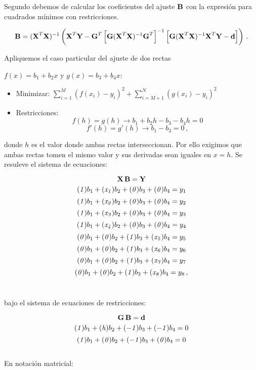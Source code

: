 \documentclass[
]{agujournal2019}
\begin{document}
Segundo debemos de calcular los coeficientes del ajuste \({\textbf B}\)
con la expresión para cuadrados mínimos con restricciones.

\[{\textbf B}=({\textbf X}^T {\textbf X})^{-1}\left( {\textbf X}^T {\textbf Y} - {\textbf G}^T\left[{\textbf G}({\textbf X}^T{\textbf X})^{-1}{\textbf G}^T \right]^{-1}
           \left[{\textbf G}({\textbf X}^T{\textbf X})^{-1}{\textbf X}^T {\textbf Y}-{\textbf d}\right] \right)\,.\]

Apliquemos el caso particular del ajuste de dos rectas

\(f(x)=b_1 + b_2 x\) y \(g(x)=b_3 + b_4 x\):\\

\begin{itemize}
\item Minimizar:  $\sum\limits^M_{i=1}(f(x_i)-y_i)^2 + \sum\limits^N_{i=M+1}(g(x_i)-y_i)^2$
\item Restricciones:
      $$f(h)=g(h)\rightarrow b_1+b_2 h - b_3 -b_4 h=0$$
      $$f'(h)=g'(h)\rightarrow b_1          - b_3           =0\,,$$
\end{itemize}

donde \(h\) es el valor donde ambas rectas interseccionan. Por ello
exigimos que ambas rectas tomen el mismo valor y sus derivadas sean
iguales en \(x=h\). Se resuleve el sistema de ecuaciones:

\[{\textbf X}\,{\textbf B}={\textbf Y}\]
\[({\it 1})b_1+({\it x_1})b_2 + ({\it 0})b_3 + ({\it 0})b_4=y_1\]
\[({\it 1})b_1+({\it x_2})b_2 + ({\it 0})b_3 + ({\it 0})b_4=y_2\]
\[({\it 1})b_1+({\it x_3})b_2 + ({\it 0})b_3 + ({\it 0})b_4=y_3\]
\[({\it 1})b_1+({\it x_4})b_2 + ({\it 0})b_3 + ({\it 0})b_4=y_4\]
\[({\it 0})b_1+({\it 0})b_2 + ({\it 1})b_3 + ({\it x_5})b_4=y_5\]
\[({\it 0})b_1+({\it 0})b_2 + ({\it 1})b_3 + ({\it x_6})b_4=y_6\]
\[({\it 0})b_1+({\it 0})b_2 + ({\it 1})b_3 + ({\it x_7})b_4=y_7\]
\[({\it 0})b_1+({\it 0})b_2 + ({\it 1})b_3 + ({\it x_8})b_4=y_8\,,\] ~

bajo el sistema de ecuaciones de restricciones:

\[{\textbf G}\,{\textbf B}={\textbf d}\]
\[({\it 1})b_1+({\it h})b_2 + (-{\it 1})b_3 + (-{\it 1})b_4=0\]
\[({\it 1})b_1+({\it 0})b_2 + (-{\it 1})b_3 + ({\it 0})b_4=0\]\\

En notación matricial:\\
\end{document}

